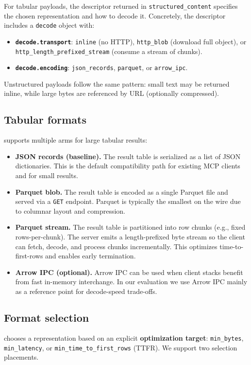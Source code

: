 For tabular payloads, the descriptor returned in \texttt{structured\_content} specifies the chosen representation and how to decode it. Concretely, the descriptor includes a \texttt{decode} object with:
\begin{itemize}
    \item \textbf{\texttt{decode.transport}}: \texttt{inline} (no HTTP), \texttt{http\_blob} (download full object), or \texttt{http\_length\_prefixed\_stream} (consume a stream of chunks).
    \item \textbf{\texttt{decode.encoding}}: \texttt{json\_records}, \texttt{parquet}, or \texttt{arrow\_ipc}.
\end{itemize}
Unstructured payloads follow the same pattern: small text may be returned inline, while large bytes are referenced by URL (optionally compressed).

\subsection{Tabular formats}
\system supports multiple arms for large tabular results:
\begin{itemize}
    \item \textbf{JSON records (baseline).} The result table is serialized as a list of JSON dictionaries. This is the default compatibility path for existing MCP clients and for small results.
    \item \textbf{Parquet blob.} The result table is encoded as a single Parquet file and served via a \texttt{GET} endpoint. Parquet is typically the smallest on the wire due to columnar layout and compression.
    \item \textbf{Parquet stream.} The result table is partitioned into row chunks (e.g., fixed rows-per-chunk). The server emits a length-prefixed byte stream so the client can fetch, decode, and process chunks incrementally. This optimizes time-to-first-rows and enables early termination.
    \item \textbf{Arrow IPC (optional).} Arrow IPC can be used when client stacks benefit from fast in-memory interchange. In our evaluation we use Arrow IPC mainly as a reference point for decode-speed trade-offs.
\end{itemize}

\subsection{Format selection}
\system chooses a representation based on an explicit \textbf{optimization target}:
\texttt{min\_bytes}, \texttt{min\_latency}, or \texttt{min\_time\_to\_first\_rows} (TTFR). We support two selection placements.

